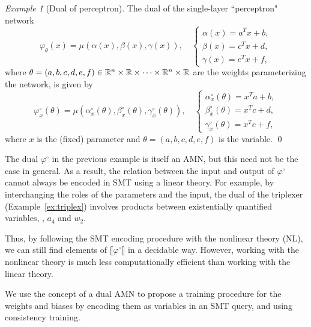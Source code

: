 \documentclass[10pt]{article}
\newcommand{\amn}{\varphi}
\newcommand{\Graph}[1]{\llbracket #1 \rrbracket}
\theoremstyle{remark}
\newtheorem{example}{Example}
\theoremstyle{definition}
\theoremstyle{plain}
\begin{document}
\begin{example}[Dual of perceptron]
The dual of the single-layer ``perceptron" network
\[
	\amn_\theta(x) = \mu(\alpha(x), \beta(x), \gamma(x)),
	\quad
	\left\{
	\begin{array}{l}
		\alpha(x) = a^T x + b,\\
		\beta(x) = c^T x + d,\\
		\gamma(x) = e^T x + f,
	\end{array}
	\right.
\]
where
$\theta=(a,b,c,d,e,f)\in\mathbb{R}^n\times\mathbb{R}\times\cdots\times\mathbb{R}^n\times\mathbb{R}$
are the weights parameterizing the network, is given by 
\[
	\amn^\circ_x(\theta) = \mu(
		\alpha^\circ_x(\theta), 
		\beta^\circ_x(\theta), 
		\gamma^\circ_x(\theta)),
	\quad
	\left\{
	\begin{array}{l}
		\alpha^\circ_x(\theta) = x^T a + b,\\
		\beta^\circ_x(\theta) = x^T c + d,\\
		\gamma^\circ_x(\theta) = x^T e + f,
	\end{array}
	\right.
\]
where $x$ is the (fixed) parameter and $\theta=(a,b,c,d,e,f)$ is the variable.
\qed	
\end{example}

The dual $\amn^\circ$ in the previous example is itself an AMN, but this need
not be the case in general.  As a result, the relation between the input and
output of $\amn^\circ$ cannot always be encoded in SMT using a linear theory.
For example, by interchanging the roles of the parameters and the input, the
dual of the triplexer (Example~\ref{ex:triplex}) involves products between
existentially quantified variables, \eg, $a_4$ and $w_2$. 

Thus, by following the SMT encoding procedure with the nonlinear theory (NL),
we can still find elements of $\Graph{\amn^\circ}$ in a decidable way. However,
working with the nonlinear theory is much less computationally efficient than
working with the linear theory.

We use the concept of a dual AMN to propose a training procedure for the
weights and biases by encoding them as variables in an SMT query, and using
consistency training.
\end{document}
